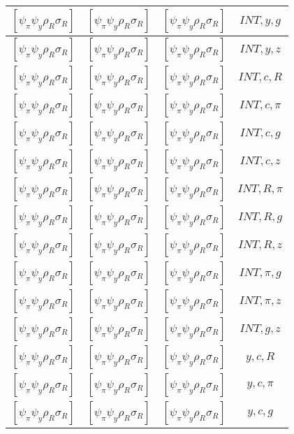 \documentclass[a4paper,10pt]{article}
\begin{document}
\begin{longtable}{|c|c|c|c|}
\hline
$[\psi_\pi \psi_y \rho_R \sigma_R ]$ & $[\psi_\pi \psi_y \rho_R \sigma_R ]$ & $[\psi_\pi \psi_y \rho_R \sigma_R ]$ & ${INT},{y},{g}$ \\
\hline
$[\psi_\pi \psi_y \rho_R \sigma_R ]$ & $[\psi_\pi \psi_y \rho_R \sigma_R ]$ & $[\psi_\pi \psi_y \rho_R \sigma_R ]$ & ${INT},{y},{z}$ \\
\hline
$[\psi_\pi \psi_y \rho_R \sigma_R ]$ & $[\psi_\pi \psi_y \rho_R \sigma_R ]$ & $[\psi_\pi \psi_y \rho_R \sigma_R ]$ & ${INT},{c},{R}$ \\
\hline
$[\psi_\pi \psi_y \rho_R \sigma_R ]$ & $[\psi_\pi \psi_y \rho_R \sigma_R ]$ & $[\psi_\pi \psi_y \rho_R \sigma_R ]$ & ${INT},{c},{\pi}$ \\
\hline
$[\psi_\pi \psi_y \rho_R \sigma_R ]$ & $[\psi_\pi \psi_y \rho_R \sigma_R ]$ & $[\psi_\pi \psi_y \rho_R \sigma_R ]$ & ${INT},{c},{g}$ \\
\hline
$[\psi_\pi \psi_y \rho_R \sigma_R ]$ & $[\psi_\pi \psi_y \rho_R \sigma_R ]$ & $[\psi_\pi \psi_y \rho_R \sigma_R ]$ & ${INT},{c},{z}$ \\
\hline
$[\psi_\pi \psi_y \rho_R \sigma_R ]$ & $[\psi_\pi \psi_y \rho_R \sigma_R ]$ & $[\psi_\pi \psi_y \rho_R \sigma_R ]$ & ${INT},{R},{\pi}$ \\
\hline
$[\psi_\pi \psi_y \rho_R \sigma_R ]$ & $[\psi_\pi \psi_y \rho_R \sigma_R ]$ & $[\psi_\pi \psi_y \rho_R \sigma_R ]$ & ${INT},{R},{g}$ \\
\hline
$[\psi_\pi \psi_y \rho_R \sigma_R ]$ & $[\psi_\pi \psi_y \rho_R \sigma_R ]$ & $[\psi_\pi \psi_y \rho_R \sigma_R ]$ & ${INT},{R},{z}$ \\
\hline
$[\psi_\pi \psi_y \rho_R \sigma_R ]$ & $[\psi_\pi \psi_y \rho_R \sigma_R ]$ & $[\psi_\pi \psi_y \rho_R \sigma_R ]$ & ${INT},{\pi},{g}$ \\
\hline
$[\psi_\pi \psi_y \rho_R \sigma_R ]$ & $[\psi_\pi \psi_y \rho_R \sigma_R ]$ & $[\psi_\pi \psi_y \rho_R \sigma_R ]$ & ${INT},{\pi},{z}$ \\
\hline
$[\psi_\pi \psi_y \rho_R \sigma_R ]$ & $[\psi_\pi \psi_y \rho_R \sigma_R ]$ & $[\psi_\pi \psi_y \rho_R \sigma_R ]$ & ${INT},{g},{z}$ \\
\hline
$[\psi_\pi \psi_y \rho_R \sigma_R ]$ & $[\psi_\pi \psi_y \rho_R \sigma_R ]$ & $[\psi_\pi \psi_y \rho_R \sigma_R ]$ & ${y},{c},{R}$ \\
\hline
$[\psi_\pi \psi_y \rho_R \sigma_R ]$ & $[\psi_\pi \psi_y \rho_R \sigma_R ]$ & $[\psi_\pi \psi_y \rho_R \sigma_R ]$ & ${y},{c},{\pi}$ \\
\hline
$[\psi_\pi \psi_y \rho_R \sigma_R ]$ & $[\psi_\pi \psi_y \rho_R \sigma_R ]$ & $[\psi_\pi \psi_y \rho_R \sigma_R ]$ & ${y},{c},{g}$ \\

\end{longtable}
\end{document}
